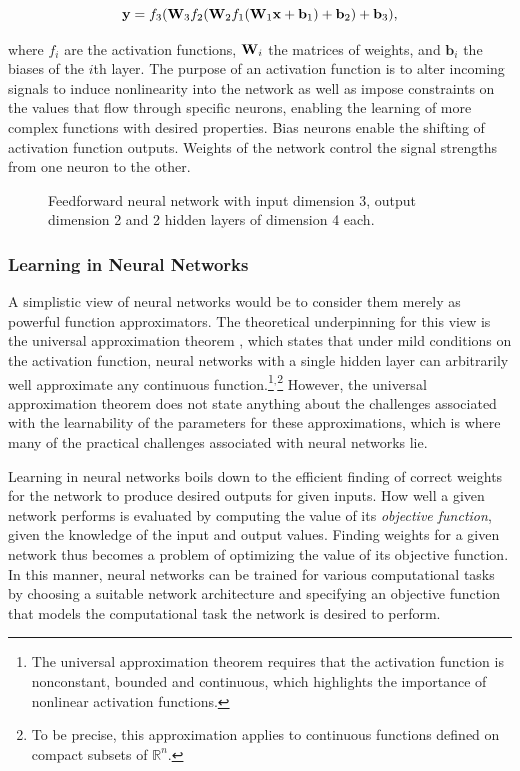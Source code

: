 $$\mathbf{y} = f_3(\mathbf{W}_3 f_2(\mathbf{W}_2 f_1(\mathbf{W}_1 \mathbf{x} + \mathbf{b}_1) + \mathbf{b}_2) + \mathbf{b}_3),$$

where $f_i$ are the activation functions, $\mathbf{W}_i$ the matrices of weights, and $\mathbf{b}_i$ the biases of the $i$th layer. The purpose of an activation function is to alter incoming signals to induce nonlinearity into the network as well as impose constraints on the values that flow through specific neurons, enabling the learning of more complex functions with desired properties. Bias neurons enable the shifting of activation function outputs. Weights of the network control the signal strengths from one neuron to the other.

\begin{figure}[!htb]
  \centering
  \resizebox{0.7\textwidth}{!}{\unskip}
  \caption{Feedforward neural network with input dimension 3, output dimension 2 and 2 hidden layers of dimension 4 each.}
  \label{fig:nn}
\end{figure}

\subsubsection{Learning in Neural Networks}
\label{section:learning_in_neural_networks}

A simplistic view of neural networks would be to consider them merely as powerful function approximators. The theoretical underpinning for this view is the universal approximation theorem \cite{universal_approximation_theorem}, which states that under mild conditions on the activation function, neural networks with a single hidden layer can arbitrarily well approximate any continuous function.\footnote{The universal approximation theorem requires that the activation function is nonconstant, bounded and continuous, which highlights the importance of nonlinear activation functions.}$^{,}$\footnote{To be precise, this approximation applies to continuous functions defined on compact subsets of $\mathbb{R}^n$.} However, the universal approximation theorem does not state anything about the challenges associated with the learnability of the parameters for these approximations, which is where many of the practical challenges associated with neural networks lie.

Learning in neural networks boils down to the efficient finding of correct weights for the network to produce desired outputs for given inputs. How well a given network performs is evaluated by computing the value of its \textit{objective function}, given the knowledge of the input and output values. Finding weights for a given network thus becomes a problem of optimizing the value of its objective function. In this manner, neural networks can be trained for various computational tasks by choosing a suitable network architecture and specifying an objective function that models the computational task the network is desired to perform.

